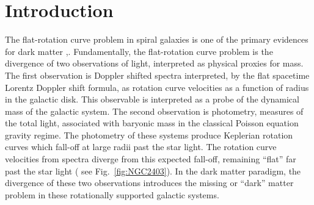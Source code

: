 \documentclass[reprint,%
 amsmath,amssymb,
 aps,
]{revtex4-1}
\begin{document}
\maketitle




\section{Introduction  \label{sec:uno}}

 The flat-rotation curve  problem in spiral galaxies is one of the primary evidences for dark matter \cite{Rub},\cite{Bosma}.  
Fundamentally, the flat-rotation curve problem is  the divergence of two observations of light, interpreted as physical proxies for mass. 
 The first observation is Doppler shifted spectra interpreted,  by the flat spacetime Lorentz Doppler shift formula, 
   as rotation curve velocities as a function of radius in the galactic disk. This observable is interpreted as a probe of the dynamical mass of the galactic system. 
   The second observation is photometry, measures of the total light,  associated with   baryonic mass in the  classical Poisson equation gravity regime. The photometry of these systems produce   Keplerian   rotation curves which fall-off at large radii past  the star light.  The  rotation curve velocities from spectra diverge from this expected fall-off,  remaining ``flat''    far past the star light   ( see Fig.~\ref{fig:NGC2403}).
    In the dark matter paradigm, the divergence of these two observations introduces the    missing or ``dark'' matter problem in  these rotationally supported galactic systems.
    
\end{document}
